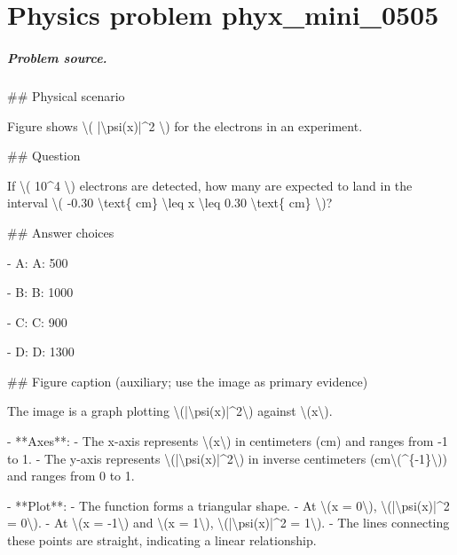 
\chapter{Physics problem phyx\_mini\_0505}
\label{ch:PhyXMiniProblems_problem_phyx_mini_0505}

\paragraph{Problem source.}
\#\# Physical scenario

Figure shows \textbackslash{}( |\textbackslash{}psi(x)|\textasciicircum{}2 \textbackslash{}) for the electrons in an experiment.

\#\# Question

If \textbackslash{}( 10\textasciicircum{}4 \textbackslash{}) electrons are detected, how many are expected to land in the interval \textbackslash{}( -0.30 \textbackslash{}text\{ cm\} \textbackslash{}leq x \textbackslash{}leq 0.30 \textbackslash{}text\{ cm\} \textbackslash{})?

\#\# Answer choices

- A: A: 500

- B: B: 1000

- C: C: 900

- D: D: 1300

\#\# Figure caption (auxiliary; use the image as primary evidence)

The image is a graph plotting \textbackslash{}(|\textbackslash{}psi(x)|\textasciicircum{}2\textbackslash{}) against \textbackslash{}(x\textbackslash{}).

- **Axes**: 
  - The x-axis represents \textbackslash{}(x\textbackslash{}) in centimeters (cm) and ranges from -1 to 1.
  - The y-axis represents \textbackslash{}(|\textbackslash{}psi(x)|\textasciicircum{}2\textbackslash{}) in inverse centimeters (cm\textbackslash{}(\textasciicircum{}\{-1\}\textbackslash{})) and ranges from 0 to 1.

- **Plot**: 
  - The function forms a triangular shape.
  - At \textbackslash{}(x = 0\textbackslash{}), \textbackslash{}(|\textbackslash{}psi(x)|\textasciicircum{}2 = 0\textbackslash{}).
  - At \textbackslash{}(x = -1\textbackslash{}) and \textbackslash{}(x = 1\textbackslash{}), \textbackslash{}(|\textbackslash{}psi(x)|\textasciicircum{}2 = 1\textbackslash{}).
  - The lines connecting these points are straight, indicating a linear relationship.

